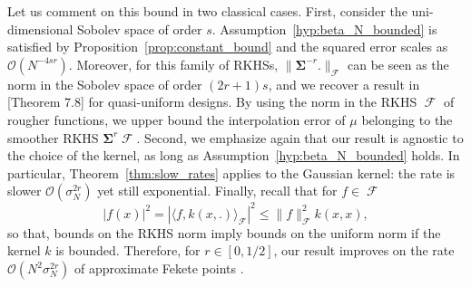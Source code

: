 \documentclass[twoside,11pt]{book}
\numberwithin{theorem}{chapter}
\numberwithin{definition}{chapter}
\numberwithin{proposition}{chapter}
\numberwithin{corollary}{chapter}
\numberwithin{example}{chapter}
\numberwithin{lemma}{chapter}
\DeclareMathOperator{\F}{\mathcal{F}}
\begin{document}
Let us comment on this bound in two classical cases. First, consider the uni-dimensional Sobolev space of order $s$. Assumption~\ref{hyp:beta_N_bounded} is satisfied by Proposition~\ref{prop:constant_bound} and the squared error scales as $\mathcal{O}(N^{-4sr})$. Moreover, for this family of RKHSs, $\|\bm{\Sigma}^{-r}.\|_{\F}$ can be seen as the norm in the Sobolev space of order $(2r+1)s$, and we recover a result in \citep{ScWe06}[Theorem 7.8] for quasi-uniform designs. By using the norm in the RKHS $\F$ of rougher functions, we upper bound the interpolation error of $\mu$ belonging to the smoother RKHS $\bm{\Sigma}^{r} \F$. Second, we emphasize again that our result is agnostic to the choice of the kernel, as long as Assumption~\ref{hyp:beta_N_bounded} holds. In particular, Theorem~\ref{thm:slow_rates} applies to the Gaussian kernel: the rate is slower $\mathcal{O}(\sigma_{N}^{2r})$ yet still exponential. Finally, recall that for $f \in \F$
\begin{equation}
|f(x)|^{2} = |\langle f, k(x,.)\rangle_{\F}|^{2} \leq\|f\|_{\F}^{2} k(x,x),
\end{equation}
so that, bounds on the RKHS norm imply bounds on the uniform norm if the kernel $k$ is bounded. Therefore, for $r \in [0,1/2]$, our result improves on the rate $\mathcal{O}(N^{2}\sigma_{N}^{2r})$ of approximate Fekete points \citep{KaSaTa19}.



\end{document}
